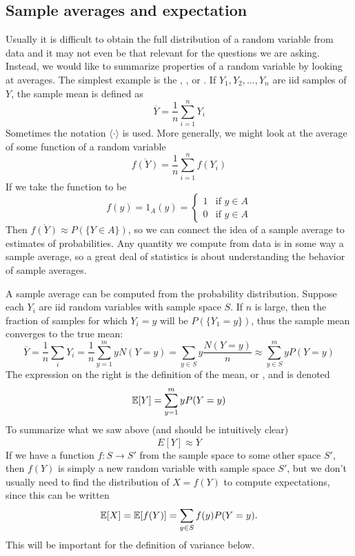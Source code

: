 \subsection{Sample averages and expectation}
 Usually it is difficult to obtain the full distribution of a random variable from data and it may not even be that relevant for the questions we are asking. Instead, we would like to summarize properties of a random variable by looking at averages. The simplest example is the , , or . 
If $Y_1,Y_2,\dots,Y_n$ are iid samples of $Y$, the sample mean is defined as
\begin{equation*}
\overline{Y} = \frac{1}{n}\sum_{i=1}^nY_i
\end{equation*}
Sometimes the notation $\langle \cdot \rangle$ is used. 
More generally, we might look at the average of some function of a random variable 
\begin{equation*}
\overline{f(Y)} = \frac{1}{n}\sum_{i=1}^nf(Y_i)
\end{equation*}
If we take the function to be 
\begin{equation}
f(y) =1_A(y) =  \left\{\begin{array}{lr} 
1 & \text{if }y \in A\\
0 & \text{if }y \in A
\end{array}\right.
\end{equation}
Then $\overline{f(Y)} \approx P(\{Y \in A\})$, so we can connect the idea of a sample average to estimates of probabilities. Any quantity we compute from data is in some way a sample average, so a great deal of statistics is about understanding the behavior of sample averages. 

A sample average can be computed from the probability distribution.  Suppose each $Y_i$ are iid random variables with sample space $S$.  If $n$ is large, then the fraction of samples for which $Y_i= y$ will be $P(\{Y_1=y\})$, thus the sample mean converges to the true mean: 
 \begin{equation*}
\overline{Y} =  \frac{1}{n}\sum_{i}Y_i = \frac{1}{n} \sum_{y=1}^m y N(Y=y) =\sum_{y \in S} y \frac{N(Y=y) }{n}\approx  \sum_{y\in S}^m y P(Y=y)
\end{equation*}
The expression on the right is the definition of the mean, or , and is denoted
\begin{equation}
\mathbb E[Y] = \sum_{y=1}^m y P(Y=y)
\end{equation}
  To summarize what we saw above (and should be intuitively clear) 
 \begin{equation}\label{eq:EappoverY}
 E[Y] \approx \overline{Y}
 \end{equation}
If we have a function $f:S \to S'$ from the sample space to some other space $S'$, then $f(Y)$ is simply a new random variable with sample space $S'$, but we don't usually need to find the distribution of $X = f(Y)$ to compute expectations, since this can be written  
\begin{equation}
\mathbb E[X] = \mathbb E[f(Y)] = \sum_{y\in S} f(y) P(Y=y). 
\end{equation}
This will be important for the definition of variance below. 


